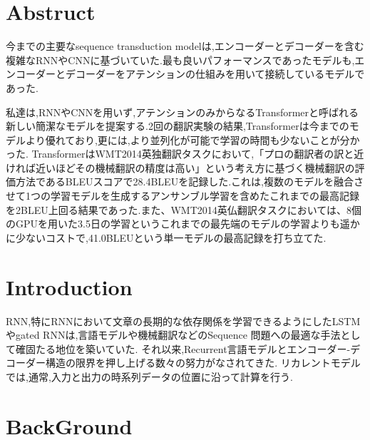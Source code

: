\documentclass[twocolumn]{jarticle}     %
\begin{document}

\section*{Abstruct}
今までの主要なsequence transduction modelは,エンコーダーとデコーダーを含む
複雑なRNNやCNNに基づいていた.最も良いパフォーマンスであったモデルも,エンコーダーとデコーダーをアテンションの仕組みを用いて接続しているモデルであった.\par
私達は,RNNやCNNを用いず,アテンションのみからなるTransformerと呼ばれる新しい簡潔なモデルを提案する.2回の翻訳実験の結果,Transformerは今までのモデルより優れており,更には,より並列化が可能で学習の時間も少ないことが分かった.
TransformerはWMT2014英独翻訳タスクにおいて,「プロの翻訳者の訳と近ければ近いほどその機械翻訳の精度は高い」という考え方に基づく機械翻訳の評価方法であるBLEUスコアで28.4BLEUを記録した.これは,複数のモデルを融合させて1つの学習モデルを生成するアンサンブル学習を含めたこれまでの最高記録を2BLEU上回る結果であった.また、WMT2014英仏翻訳タスクにおいては、8個のGPUを用いた3.5日の学習というこれまでの最先端のモデルの学習よりも遥かに少ないコストで,41.0BLEUという単一モデルの最高記録を打ち立てた.



\section{Introduction}
RNN,特にRNNにおいて文章の長期的な依存関係を学習できるようにしたLSTMやgated RNNは,言語モデルや機械翻訳などのSequence 問題への最適な手法として確固たる地位を築いていた.
それ以来,Recurrent言語モデルとエンコーダー-デコーダー構造の限界を押し上げる数々の努力がなされてきた.
リカレントモデルでは,通常,入力と出力の時系列データの位置に沿って計算を行う.
\section{BackGround}
\end{document}
